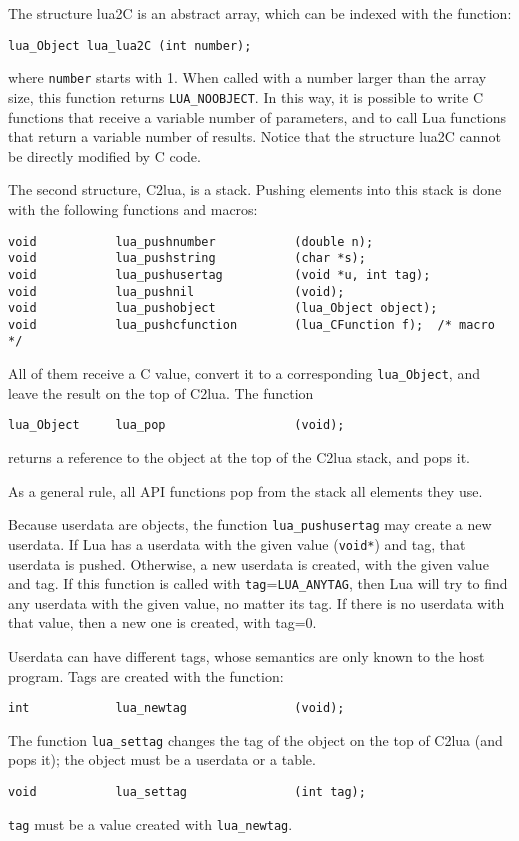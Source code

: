 The structure lua2C is an abstract array,
which can be indexed with the function:
\begin{verbatim}
lua_Object lua_lua2C (int number);
\end{verbatim}
where \verb|number| starts with 1.
When called with a number larger than the array size,
this function returns \verb|LUA_NOOBJECT|.
In this way, it is possible to write C functions that receive
a variable number of parameters,
and to call Lua functions that return a variable number of results.
Notice that the structure lua2C cannot be directly modified by C code.

The second structure, C2lua, is a stack.
Pushing elements into this stack
is done with the following functions and macros:
\label{pushing}
\begin{verbatim}
void           lua_pushnumber           (double n);
void           lua_pushstring           (char *s);
void           lua_pushusertag          (void *u, int tag);
void           lua_pushnil              (void);
void           lua_pushobject           (lua_Object object);
void           lua_pushcfunction        (lua_CFunction f);  /* macro */
\end{verbatim}
All of them receive a C value,
convert it to a corresponding \verb|lua_Object|,
and leave the result on the top of C2lua.
The function
\begin{verbatim}
lua_Object     lua_pop                  (void);
\end{verbatim}
returns a reference to the object at the top of the C2lua stack,
and pops it.

As a general rule, all API functions pop from the stack
all elements they use.

Because userdata are objects,
the function \verb|lua_pushusertag| may create a new userdata.
If Lua has a userdata with the given value (\verb|void*|) and tag,
that userdata is pushed.
Otherwise, a new userdata is created, with the given value and tag.
If this function is called with
\verb|tag|=\verb|LUA_ANYTAG|,
then Lua will try to find any userdata with the given value,
no matter its tag.
If there is no userdata with that value, then a new one is created,
with tag=0.

Userdata can have different tags,
whose semantics are only known to the host program.
Tags are created with the function:
\begin{verbatim}
int            lua_newtag               (void);
\end{verbatim}
The function \verb|lua_settag| changes the tag of
the object on the top of C2lua (and pops it);
the object must be a userdata or a table.
\begin{verbatim}
void           lua_settag               (int tag);
\end{verbatim}
\verb|tag| must be a value created with \verb|lua_newtag|.


